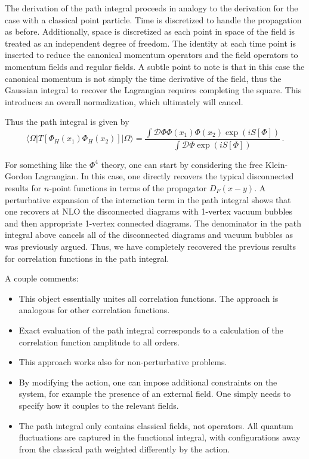 \documentclass[12pt]{memoir}
\begin{document}
The derivation of the path integral proceeds in analogy to the derivation for the case
with a classical point particle.
Time is discretized to handle the propagation as before.
Additionally, space is discretized as each point in space of the field is treated as an independent degree of freedom.
The identity at each time point is inserted to reduce the canonical momentum operators and the field operators
to momentum fields and regular fields.
A subtle point to note is that in this case the canonical momentum is not simply the time derivative of the field,
thus the Gaussian integral to recover the Lagrangian requires completing the square.
This introduces an overall normalization, which ultimately will cancel.

Thus the path integral is given by
\begin{equation}
  \langle \Omega \vert T[\Phi_H(x_1) \Phi_H(x_2)] \vert \Omega \rangle
  = \frac{\int \mathcal{D}\Phi \Phi(x_1) \Phi(x_2) \exp(i S[\Phi])}{\int \mathcal{D}\Phi \exp(i S[\Phi])}\,.
\end{equation}

For something like the $\Phi^4$ theory,
one can start by considering the free Klein-Gordon Lagrangian.
In this case, one directly recovers the typical disconnected results for $n$-point functions
in terms of the propagator $D_F(x-y)$.
A perturbative expansion of the interaction term in the path integral shows
that one recovers at NLO the disconnected diagrams with 1-vertex vacuum bubbles
and then appropriate 1-vertex connected diagrams.
The denominator in the path integral above cancels all of the disconnected diagrams and vacuum bubbles
as was previously argued.
Thus, we have completely recovered the previous results for correlation functions in the path integral.

A couple comments:
\begin{itemize}
  \item This object essentially unites all correlation functions.
    The approach is analogous for other correlation functions.
  \item Exact evaluation of the path integral corresponds to a calculation of the correlation function
    amplitude to all orders.
  \item This approach works also for non-perturbative problems.
  \item By modifying the action, one can impose additional constraints on the system,
    for example the presence of an external field.
    One simply needs to specify how it couples to the relevant fields.
  \item The path integral only contains classical fields, not operators.
    All quantum fluctuations are captured in the functional integral,
    with configurations away from the classical path weighted differently by the action.
\end{itemize}
\end{document}
